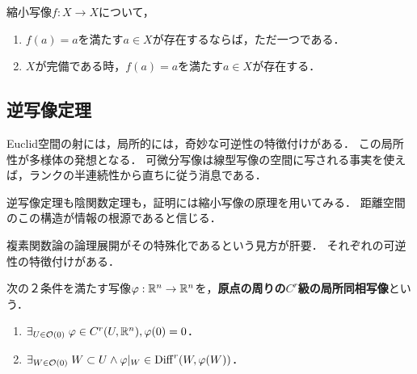 \documentclass[uplatex,dvipdfmx]{jsreport}
\begin{document}
\begin{theorem}
    縮小写像$f:X\to X$について，
    \begin{enumerate}
        \item $f(a)=a$を満たす$a\in X$が存在するならば，ただ一つである．
        \item $X$が完備である時，$f(a)=a$を満たす$a\in X$が存在する．
    \end{enumerate}
\end{theorem}

\subsection{逆写像定理}

\begin{tcolorbox}[colframe=ForestGreen, colback=ForestGreen!10!white,breakable,colbacktitle=ForestGreen!40!white,coltitle=black,fonttitle=\bfseries\sffamily,
title=]
    Euclid空間の射には，局所的には，奇妙な可逆性の特徴付けがある．
    この局所性が多様体の発想となる．
    可微分写像は線型写像の空間に写される事実を使えば，ランクの半連続性から直ちに従う消息である．

    逆写像定理も陰関数定理も，証明には縮小写像の原理を用いてみる．
    距離空間のこの構造が情報の根源であると信じる．

    複素関数論の論理展開がその特殊化であるという見方が肝要．
    それぞれの可逆性の特徴付けがある．
\end{tcolorbox}

\begin{definition}
    次の２条件を満たす写像$\varphi:\mathbb{R}^n\to\mathbb{R}^n$を，\textbf{原点の周りの$C^r$級の局所同相写像}という．
    \begin{enumerate}
        \item $\exists_{U\in\mathcal{O}(0)}\;\varphi\in C^r(U,\mathbb{R}^n),\varphi(0)=0$．
        \item $\exists_{W\in\mathcal{O}(0)}\;W\subset U\land \varphi|_W\in\mathrm{Diff}^r(W,\varphi(W))$．
    \end{enumerate}
\end{definition}
\end{document}
